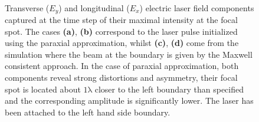 \begin{figure}[h!]
	\centering
	\hspace{2mm}
	\\
	\hspace{2mm}
	\caption{Transverse ($ E_{y} $) and longitudinal ($ E_{x} $) electric laser field components captured at the time step of their maximal intensity at the focal spot. The cases \textbf{(a)}, \textbf{(b)} correspond to the laser pulse initialized using the paraxial approximation, whilst \textbf{(c)}, \textbf{(d)} come from the simulation where the beam at the boundary is given by the Maxwell consistent approach. In the case of paraxial approximation, both components reveal strong distortions and asymmetry, their focal spot is located about $ \mathrm{1 \lambda} $ closer to the left boundary than specified and the corresponding amplitude is significantly lower. The laser has been attached to the left hand side boundary.}
	\label{fig:1}
\end{figure}


